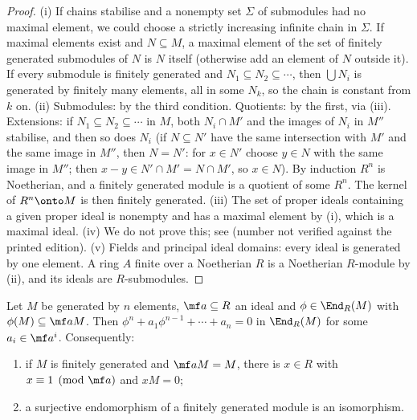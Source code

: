 \begin{proof}
(i) If chains stabilise and a nonempty set $\Sigma$ of submodules had no maximal element, we could choose a strictly
increasing infinite chain in $\Sigma$. If maximal elements exist and $N\subseteq M$, a maximal element of the set of finitely
generated submodules of $N$ is $N$ itself (otherwise add an element of $N$ outside it). If every submodule is finitely
generated and $N_1\subseteq N_2\subseteq\cdots$, then $\bigcup N_i$ is generated by finitely many elements, all in some $N_k$, so the chain
is constant from $k$ on.
(ii) Submodules: by the third condition. Quotients: by the first, via (iii). Extensions: if
$N_1\subseteq N_2\subseteq\cdots$ in $M$, both $N_i\cap M'$ and the images of $N_i$ in $M''$ stabilise, and then so does $N_i$ (if
$N\subseteq N'$ have the same intersection with $M'$ and the same image in $M''$, then $N=N'$: for $x\in N'$ choose $y\in N$ with the same
image in $M''$; then $x-y\in N'\cap M'=N\cap M'$, so $x\in N$). By induction $R^n$ is Noetherian,
and a finitely generated module is a quotient of some $R^n$. The kernel of $R^n\onto M$ is then finitely generated.
(iii) The set of proper ideals containing a given proper ideal is nonempty and has a maximal element by (i), which is a maximal
ideal.
(iv) We do not prove this; see \cite[Theorem 7.5]{AtiyahMacdonald} (number not verified against the printed edition).
(v) Fields and principal ideal domains: every ideal is generated by one element. A ring $A$ finite over a Noetherian $R$ is a
Noetherian $R$-module by (ii), and its ideals are $R$-submodules.
\end{proof}

\begin{lemma}\label{lem:modules:determinant-trick}
Let $M$ be generated by $n$ elements, $\mf a\subseteq R$ an ideal and $\phi\in\End_R(M)$ with $\phi(M)\subseteq\mf aM$. Then
$\phi^n+a_1\phi^{n-1}+\cdots+a_n=0$ in $\End_R(M)$ for some $a_i\in\mf a^i$. Consequently:
\begin{enumerate}[label=(\alph*)]
\item if $M$ is finitely generated and $\mf aM=M$, there is $x\in R$ with $x\equiv1\pmod{\mf a}$ and $xM=0$;
\item a surjective endomorphism of a finitely generated module is an isomorphism.
\end{enumerate}
\end{lemma}

